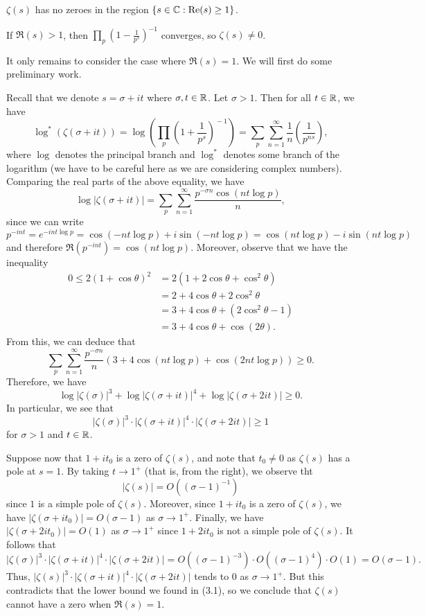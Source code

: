 \begin{thm}
$\zeta(s)$ has no zeroes in the region $\{s \in \mathbb{C} : 
{\rm Re}(s) \geq 1\}$. 
\end{thm}
\begin{pf}
If $\Re(s) > 1$, then $\prod_p (1 - \frac1{p^s})^{-1}$ 
converges, so $\zeta(s) \neq 0$. 

It only remains to consider the case where $\Re(s) = 1$. 
We will first do some preliminary work. 

Recall that we denote $s = \sigma + it$ where $\sigma, t \in \mathbb{R}$. Let $\sigma > 1$. Then for all $ t \in \mathbb{R}$, we have 
\[ \log^*(\zeta(\sigma + it)) = 
\log \left( \prod_p \left(1 + \frac1{p^s}\right)^{\!-1}\right) = \sum_p \sum_{n=1}^\infty \frac1n \left( \frac1{p^{ns}} \right), \]
where $\log$ denotes the principal branch and 
$\log^*$ denotes some branch of the logarithm (we have to be
careful here as we are considering complex numbers). Comparing
the real parts of the above equality, we have 
\[ \log|\zeta(\sigma+it)| = \sum_p \sum_{n=1}^\infty 
\frac{p^{-\sigma n} \cos(nt \log p)}{n}, \]
since we can write 
\[ p^{-int} = e^{-int \log p} = \cos(-nt \log p) + 
i \sin(-nt \log p) = \cos(nt \log p) - i\sin(nt \log p) \]
and therefore $\Re(p^{-int}) = \cos(nt \log p)$. 
Moreover, observe that we have the inequality 
\begin{align*}
    0 \leq 2(1+\cos\theta)^2 
    &= 2(1 + 2\cos\theta + \cos^2\theta) \\
    &= 2 + 4\cos\theta + 2\cos^2\theta \\
    &= 3 + 4\cos\theta + (2\cos^2\theta - 1) \\
    &= 3 + 4\cos\theta + \cos(2\theta). 
\end{align*}
From this, we can deduce that 
\[ \sum_p \sum_{n=1}^\infty \frac{p^{-\sigma n}}n 
(3 + 4\cos(nt \log p) + \cos(2nt \log p)) \geq 0. \]
Therefore, we have 
\[ \log|\zeta(\sigma)|^3 + \log|\zeta(\sigma+it)|^4 + 
\log|\zeta(\sigma+2it)| \geq 0. \]
In particular, we see that 
\begin{equation}
    |\zeta(\sigma)|^3 \cdot |\zeta(\sigma + it)|^4 
\cdot |\zeta(\sigma+2it)| \geq 1
\end{equation} 
for $\sigma > 1$ and $t \in \mathbb{R}$. 

Suppose now that $1 + it_0$ is a zero of $\zeta(s)$, 
and note that $t_0 \neq 0$ as $\zeta(s)$ has a pole at 
$s = 1$. By taking $t \to 1^+$ (that is, from the right), 
we observe tht 
\[ |\zeta(s)| = O((\sigma - 1)^{-1}) \]
since $1$ is a simple pole of $\zeta(s)$. Moreover, 
since $1 + it_0$ is a zero of $\zeta(s)$, we have 
$|\zeta(\sigma + it_0)| = O(\sigma-1)$ as 
$\sigma \to 1^+$. Finally, we have 
$|\zeta(\sigma + 2it_0)| = O(1)$ as $\sigma \to 1^+$ 
since $1 + 2it_0$ is not a simple pole of $\zeta(s)$. 
It follows that 
\[ |\zeta(\sigma)|^3 \cdot |\zeta(\sigma + it)|^4 
\cdot |\zeta(\sigma + 2it)| = 
O((\sigma - 1)^{-3}) \cdot O((\sigma - 1)^4) \cdot O(1) 
= O(\sigma - 1). \]
Thus, $|\zeta(s)|^3 \cdot |\zeta(\sigma+it)|^4 \cdot 
|\zeta(\sigma + 2it)|$ tends to $0$ as $\sigma \to 1^+$. 
But this contradicts that the lower bound we found in (3.1), 
so we conclude that $\zeta(s)$ cannot have a zero when 
$\Re(s) = 1$. 
\end{pf}

